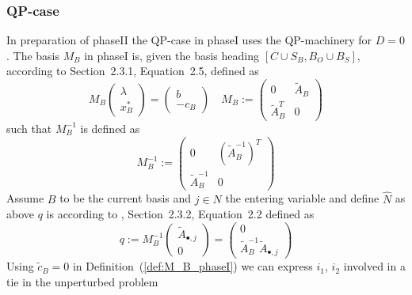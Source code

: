 \documentclass[a4paper]{article}
\begin{document}
\subsubsection{QP-case}
In preparation of phaseII the QP-case in phaseI uses the QP-machinery for $D=0$.
The basis $M_{B}$ in phaseI is, given the basis heading
$\left[C \cup S_{B}, B_{O} \cup B_{S} \right]$,
according to \cite{Sven} Section~2.3.1, Equation~2.5, defined as
\begin{equation}
\label{def:M_B_phaseI}
M_{B}
\left(\begin{array}{c}
        \lambda \\
	\hline
	x_{B}^{*}
      \end{array}
\right)
=
\left(\begin{array}{c}
        b \\
	\hline
	-c_{B}
       \end{array}
\right)
\quad
M_{B}:=
\left(\begin{array}{c|c}
        0 & \tilde{A}_{B} \\
	\hline
	\tilde{A}_{B}^{T} & 0 
       \end{array}
\right)
\end{equation}
such that $M_{B}^{-1}$ is defined as
\begin{equation}
\label{def:M_B_inv_phaseI}
M_{B}^{-1}:=
\left(\begin{array}{c|c}
        0 & \left(\tilde{A}_{B}^{-1}\right)^{T} \\
	\hline
	\tilde{A}_{B}^{-1} & 0
       \end{array}
\right)
\end{equation}
Assume $B$ to be the current basis and $j \in N$ the entering variable and
define $\hat{N}$ as above $q$ is according to \cite{Sven}, Section~2.3.2,
Equation~2.2 defined as
\begin{equation}
\label{def:q_phaseI}
q:= M_{B}^{-1}
\left(\begin{array}{c}
        \tilde{A}_{\bullet, j} \\
	\hline
        0
      \end{array}
\right)
=
\left(\begin{array}{c}
        0 \\
	\hline
	\tilde{A}_{B}^{-1}\tilde{A}_{\bullet, j}
       \end{array}
\right)
\end{equation}
Using $\tilde{c}_{B}=0$ in Definition~(\ref{def:M_B_phaseI})
we can express $i_{1}$, $i_{2}$ involved in a tie in the unperturbed problem
\end{document}
